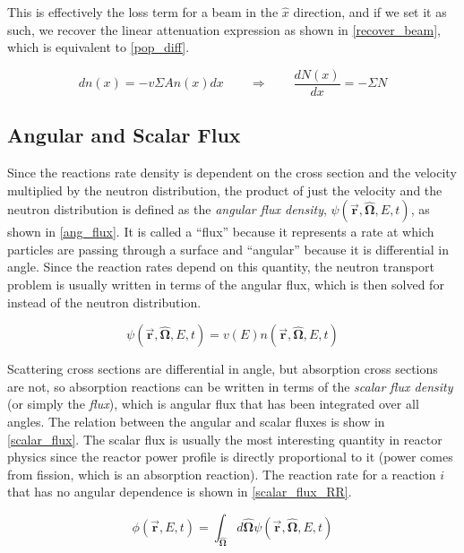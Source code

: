 This is effectively the loss term for a beam in the $\hat{x}$ direction, and if we set it as such, we recover the linear attenuation expression as shown in \eqref{recover_beam}, which is equivalent to \eqref{pop_diff}.  

\begin{equation}
\label{recover_beam}
dn(x) = - v \Sigma A n(x)dx  \qquad \Rightarrow \qquad  \frac{dN(x)}{dx}= - \Sigma N
\end{equation}


\subsection{Angular and Scalar Flux}

Since the reactions rate density is dependent on the cross section and the velocity multiplied by the neutron distribution, the product of just the velocity and the neutron distribution is defined as the \emph{angular flux density}, $\psi(\boldsymbol{\vec{r}},\boldsymbol{\hat{\Omega}},E,t)$,  as shown in \eqref{ang_flux}.  It is called a ``flux'' because it represents a rate at which particles are passing through a surface and ``angular'' because it is differential in angle.  Since the reaction rates depend on this quantity, the neutron transport problem is usually written in terms of the angular flux, which is then solved for instead of the neutron distribution.

\begin{equation}
\label{ang_flux}
\psi(\boldsymbol{\vec{r}},\boldsymbol{\hat{\Omega}},E,t) = v(E) n(\boldsymbol{\vec{r}},\boldsymbol{\hat{\Omega}},E,t)
\end{equation}

Scattering cross sections are differential in angle, but absorption cross sections are not, so absorption reactions can be written in terms of the \emph{scalar flux density} (or simply the \emph{flux}), which is angular flux that has been integrated over all angles.  The relation between the angular and scalar fluxes is show in \eqref{scalar_flux}.  The scalar flux is usually the most interesting quantity in reactor physics since the reactor power profile is directly proportional to it (power comes from fission, which is an absorption reaction).  The reaction rate for a reaction $i$ that has no angular dependence is shown in \eqref{scalar_flux_RR}.

\begin{equation}
\label{scalar_flux}
\phi(\boldsymbol{\vec{r}},E,t) = \int_{\boldsymbol{\hat{\Omega}}} d\boldsymbol{\hat{\Omega}} \psi(\boldsymbol{\vec{r}},\boldsymbol{\hat{\Omega}},E,t)
\end{equation}

